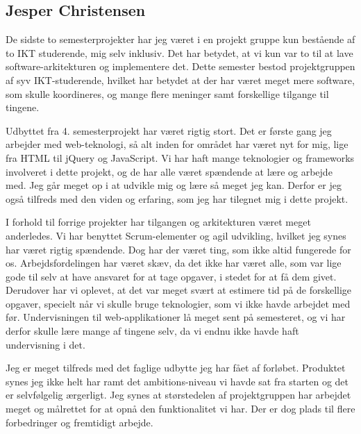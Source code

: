 \subsection*{Jesper Christensen}

De sidste to semesterprojekter har jeg været i en projekt gruppe kun bestående af to IKT studerende, mig selv inklusiv. Det har betydet, at vi kun var to til at lave software-arkitekturen og implementere det. Dette semester bestod projektgruppen af syv IKT-studerende, hvilket har betydet at der har været meget mere software, som skulle koordineres, og mange flere meninger samt forskellige tilgange til tingene. 

Udbyttet fra 4. semesterprojekt har været rigtig stort. Det er første gang jeg arbejder med web-teknologi, så alt inden for området har været nyt for mig, lige fra HTML til jQuery og JavaScript. Vi har haft mange teknologier og frameworks involveret i dette projekt, og de har alle været spændende at lære og arbejde med. Jeg går meget op i at udvikle mig og lære så meget jeg kan. Derfor er jeg også tilfreds med den viden og erfaring, som jeg har tilegnet mig i dette projekt.

I forhold til forrige projekter har tilgangen og arkitekturen været meget anderledes. Vi har benyttet Scrum-elementer og agil udvikling, hvilket jeg synes har været rigtig spændende. Dog har der været ting, som ikke altid fungerede for os. Arbejdsfordelingen har været skæv, da det ikke har været alle, som var lige gode til selv at have ansvaret for at tage opgaver, i stedet for at få dem givet. Derudover har vi oplevet, at det var meget svært at estimere tid på de forskellige opgaver, specielt når vi skulle bruge teknologier, som vi ikke havde arbejdet med før. Undervisningen til web-applikationer lå meget sent på semesteret, og vi har derfor skulle lære mange af tingene selv, da vi endnu ikke havde haft undervisning i det.

Jeg er meget tilfreds med det faglige udbytte jeg har fået af forløbet. Produktet synes jeg ikke helt har ramt det ambitions-niveau vi havde sat fra starten og det er selvfølgelig ærgerligt. Jeg synes at størstedelen af projektgruppen har arbejdet meget og målrettet for at opnå den funktionalitet vi har. Der er dog plads til flere forbedringer og fremtidigt arbejde.